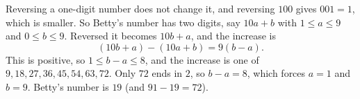 Reversing a one-digit number does not change it, and reversing $100$ gives $001=1$, which is smaller. So Betty's number has two digits, say $10a+b$ with $1\le a\le9$ and $0\le b\le9$. Reversed it becomes $10b+a$, and the increase is
\[(10b+a)-(10a+b)=9(b-a).\]
This is positive, so $1\le b-a\le8$, and the increase is one of $9,18,27,36,45,54,63,72$. Only $72$ ends in $2$, so $b-a=8$, which forces $a=1$ and $b=9$. Betty's number is $\boxed{19}$ (and $91-19=72$).
